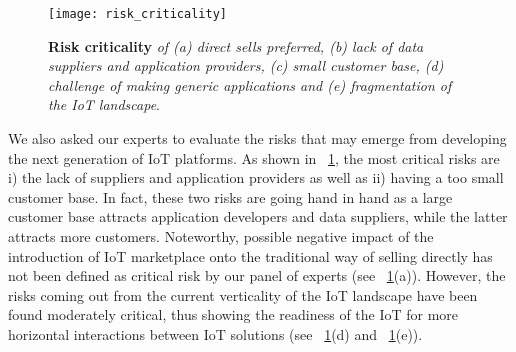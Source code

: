 \documentclass[preprint,10pt,5p]{elsarticle}
\begin{document}
\begin{figure}[t]
  \centering
  \texttt{[image: risk\_criticality]}
  \caption{\textbf{Risk criticality} \textsl{of (a) direct sells preferred, (b) lack of
  data suppliers and application providers, (c) small customer base,
  (d) challenge of making generic applications and (e) fragmentation
  of the IoT landscape}.}
  \label{fig:survey_risk}
\end{figure}

We also asked our experts to evaluate the risks that may emerge
from developing the next generation of IoT platforms. 
As shown in \figurename{~\ref{fig:survey_risk}}, the most critical
risks are i) the lack of suppliers and application providers as well as
ii) having a too small customer base. 
In fact, these two risks are going hand in hand as a large customer
base attracts application developers and data suppliers, while the
latter attracts more customers.
Noteworthy, possible negative impact of the
introduction of IoT marketplace onto the traditional way of selling
directly has not been
defined as critical risk by our panel of experts (see \figurename{~\ref{fig:survey_risk}}(a)).
However, the risks coming out from the current verticality of the IoT
landscape have been found moderately critical, thus showing the
readiness of the IoT for more horizontal interactions between IoT
solutions (see \figurename{~\ref{fig:survey_risk}}(d) and \figurename{~\ref{fig:survey_risk}}(e)).
\end{document}
